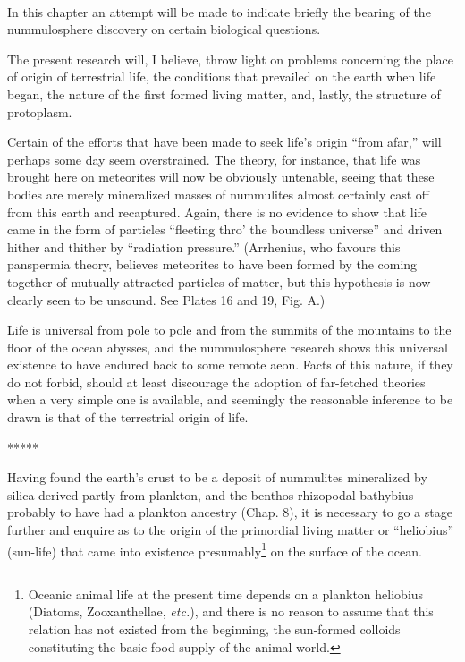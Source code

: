 \documentclass[a4paper, 12pt, oneside]{article}
\begin{document}
\paragraph{}
In this chapter an attempt will be made to indicate briefly the bearing of the nummulosphere discovery on certain biological questions.

The present research will, I believe, throw light on problems concerning the place of origin of terrestrial life, the conditions that prevailed on the earth when life began, the nature of the first formed living matter, and, lastly, the structure of protoplasm.

Certain of the efforts that have been made to seek life's origin ``from afar,'' will perhaps some day seem overstrained. The theory, for instance, that life was brought here on meteorites will now be obviously untenable, seeing that these bodies are merely mineralized masses of nummulites almost certainly cast off from this earth and recaptured. Again, there is no evidence to show that life came in the form of particles ``fleeting thro' the boundless universe'' and driven hither and thither by ``radiation pressure.'' (Arrhenius, who favours this panspermia theory, believes meteorites to have been formed by the coming together of mutually-attracted particles of matter, but this hypothesis is now clearly seen to be unsound. See Plates 16 and 19, Fig. A.)

Life is universal from pole to pole and from the summits of the mountains to the floor of the ocean abysses, and the nummulosphere research shows this universal existence to have endured back to some remote aeon. Facts of this nature, if they do not forbid, should at least discourage the adoption of far-fetched theories when a very simple one is available, and seemingly the reasonable inference to be drawn is that of the terrestrial origin of life.

\centerline{*\hspace{15mm}*\hspace{15mm}*\hspace{15mm}*\hspace{15mm}*}
\bigskip

Having found the earth's crust to be a deposit of nummulites mineralized by silica derived partly from plankton, and the benthos rhizopodal bathybius probably to have had a plankton ancestry (Chap. 8), it is necessary to go a stage further and enquire as to the origin of the primordial living matter or ``heliobius'' (sun-life) that came into existence presumably\footnote{Oceanic animal life at the present time depends on a plankton heliobius (Diatoms, Zooxanthellae, \emph{etc.}), and there is no reason to assume that this relation has not existed from the beginning, the sun-formed colloids constituting the basic food-supply of the animal world.} on the surface of the ocean.
\end{document}
